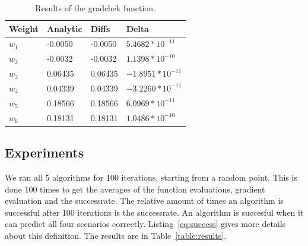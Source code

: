\documentclass{article}
\begin{document}


	



\begin{table}[H]
	\centering
	\begin{tabular}{| l | l | l | l |}
		\hline
		Weight & Analytic & Diffs & Delta \\ \hline
$w_1$ & -0.0050 & -0.0050 & $5.4682*10^{-11}$ \\ \hline
$w_2$ & -0.0032 & -0.0032 & $1.1398*10^{-10}$ \\ \hline
$w_3$ & 0.06435 & 0.06435 & $-1.8951*10^{-11}$ \\ \hline
$w_4$ & 0.04339 & 0.04339 & $-3.2260*10^{-11}$ \\ \hline
$w_5$ & 0.18566 & 0.18566 & $6.0969*10^{-11}$ \\ \hline
$w_6$ & 0.18131 & 0.18131 & $1.0486*10^{-10}$ \\ \hline
	\end{tabular}
	\caption{Results of the gradchek function.}
	\label{table:gradchek}
\end{table}

\subsection{Experiments}
We ran all 5 algorithms for 100 iterations, starting from a random point. This is done 100 times to get the averages of the function evaluations, gradient evaluation and the successrate. The relative amount of times an algorithm is successful after 100 iterations is the successrate. An algorithm is succesful when it can predict all four scenarios correctly. Listing~\ref{eq:success} gives more details about this definition. The results are in Table~\ref{table:results}. 
\end{document}
